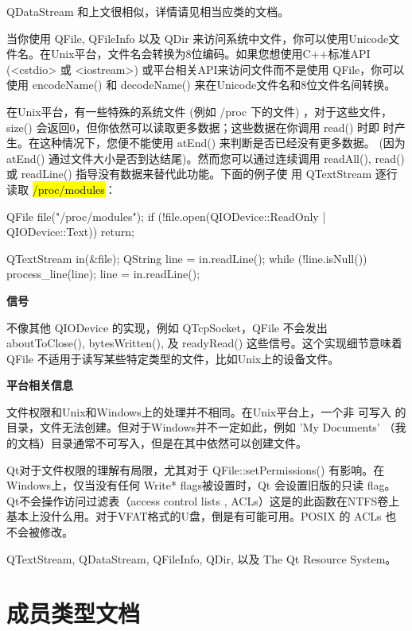 QDataStream 和上文很相似，详情请见相当应类的文档。

当你使用 QFile, QFileInfo 以及 QDir 来访问系统中文件，你可以使用Unicode文件名。在Unix平台，文件名会转换为8位编码。如果您想使用C++标准API (<cstdio> 或 <iostream>) 或平台相关API来访问文件而不是使用 QFile，你可以使用 encodeName() 和 decodeName() 来在Unicode文件名和8位文件名间转换。

在Unix平台，有一些特殊的系统文件 (例如 /proc 下的文件) ，对于这些文件，
size() 会返回0，但你依然可以读取更多数据；这些数据在你调用 read() 时即
时产生。在这种情况下，您便不能使用 atEnd() 来判断是否已经没有更多数据。
(因为 atEnd() 通过文件大小是否到达结尾)。然而您可以通过连续调用
readAll(), read() 或 readLine() 指导没有数据来替代此功能。下面的例子使
用 QTextStream 逐行读取 \hl{/proc/modules}：

\begin{cppcode}
    QFile file("/proc/modules");
    if (!file.open(QIODevice::ReadOnly | QIODevice::Text))
        return;

    QTextStream in(&file);
    QString line = in.readLine();
    while (!line.isNull()) {
        process_line(line);
        line = in.readLine();
    }
\end{cppcode}

\textbf{信号}

不像其他 QIODevice 的实现，例如 QTcpSocket，QFile 不会发出 aboutToClose(), bytesWritten(), 及 readyRead() 这些信号。这个实现细节意味着 QFile 不适用于读写某些特定类型的文件，比如Unix上的设备文件。

\textbf{平台相关信息}

文件权限和Unix和Windows上的处理并不相同。在Unix平台上，一个非 可写入 的目录，文件无法创建。但对于Windows并不一定如此，例如 'My Documents' （我的文档）目录通常不可写入，但是在其中依然可以创建文件。

Qt对于文件权限的理解有局限，尤其对于 QFile::setPermissions() 有影响。在Windows上，仅当没有任何 Write* flags被设置时，Qt 会设置旧版的只读 flag。Qt不会操作访问过滤表（access control lists , ACLs）这是的此函数在NTFS卷上基本上没什么用。对于VFAT格式的U盘，倒是有可能可用。POSIX 的 ACLs 也不会被修改。


\begin{seeAlso}
QTextStream, QDataStream, QFileInfo, QDir, 以及 The Qt
Resource System。
\end{seeAlso} 

\splitLine

\section{成员类型文档}

